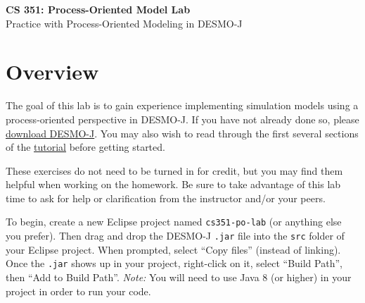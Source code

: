 \documentclass[11pt]{article}
\newcommand{\courseNumber}{CS 351}
\newcommand{\miscName}{Process-Oriented Model Lab}
\newcommand{\file}[1]{\texttt{#1}}
\begin{document}
\thispagestyle{empty}
\begin{center}
  {\LARGE\textbf{\courseNumber{}: \miscName{}}}
  \\\smallskip
  {\Large Practice with Process-Oriented Modeling in DESMO-J}
\end{center}
\bigskip

\section*{Overview}
The goal of this lab is to gain experience implementing simulation models
using a process-oriented perspective in DESMO-J. If you have not already done
so, please
%
\href{http://sourceforge.net/projects/desmoj/files/desmoj/2.5.1e/desmoj-2.5.1e-bin.jar}%
{download DESMO-J}.
%
You may also wish to read through the first several sections of the
\href{http://desmoj.sourceforge.net/tutorial/overview/0.html}{tutorial}
before getting started.

These exercises do not need to be turned in for credit, but you may find them
helpful when working on the homework. Be sure to take advantage of this lab
time to ask for help or clarification from the instructor and/or your peers.

To begin, create a new Eclipse project named \file{cs351-po-lab} (or anything
else you prefer). Then drag and drop the DESMO-J \file{.jar} file into the
\file{src} folder of your Eclipse project. When prompted, select ``Copy
files'' (instead of linking). Once the \file{.jar} shows up in your project,
right-click on it, select ``Build Path'', then ``Add to Build Path''.
\textit{Note:} You will need to use Java 8 (or higher) in your project in
order to run your code.

\end{document}
